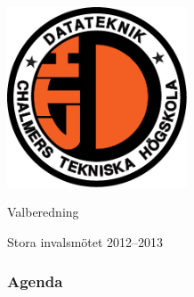 \documentclass[unicode, handout, 10pt, t,subsection=true]{beamer}
\begin{document}
\begin{frame}[c]
\begin{center}
\includegraphics[width=0.4\textwidth]{dteklogo}
\bigskip
\bfseries

{\LARGE Valberedning}

\smallskip

{\large Stora invalsmötet 2012--2013}
\end{center}
\end{frame}


\begin{frame}
\frametitle{Agenda}
\tableofcontents
\end{frame}






\end{document}
